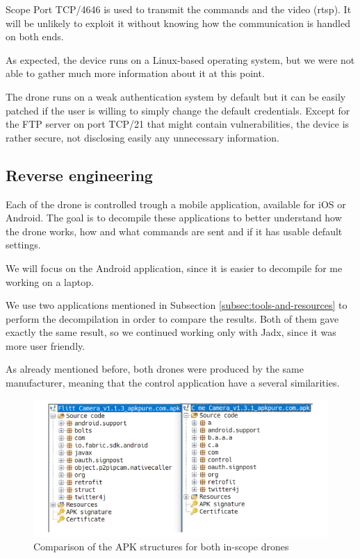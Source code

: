 \begin{chaptercover}{Scope}
Port TCP/4646 is used to transmit the commands and the video (\acrshort{rtsp}). It will be unlikely to exploit it without knowing how the communication is handled on both ends.

As expected, the device runs on a Linux-based operating system, but we were not able to gather much more information about it at this point.

\begin{tip}
The drone runs on a weak authentication system by default but it can be easily patched if the user is willing to simply change the default credentials.
Except for the FTP server on port TCP/21 that might contain vulnerabilities, the device is rather secure, not disclosing easily any unnecessary information.
\end{tip}

\subsection{Reverse engineering}\label{subsec:reverse-engineering}

Each of the drone is controlled trough a mobile application, available for iOS or Android. The goal is to decompile these applications to better understand how the drone works, how and what commands are sent and if it has usable default settings.

We will focus on the Android application, since it is easier to decompile for me working on a laptop. 

We use two applications mentioned in Subsection \ref{subsec:tools-and-resources} to perform the decompilation in order to compare the results. Both of them gave exactly the same result, so we continued working only with Jadx, since it was more user friendly.

As already mentioned before, both drones were produced by the same manufacturer, meaning that the control application have a several similarities.

\begin{figure}[H]
  \centering
  \includegraphics[width=\linewidth]{figures/apk-comparison}
  \caption{Comparison of the APK structures for both in-scope drones}
  \label{fig:apk-comparison}
\end{figure}


\end{chaptercover}

